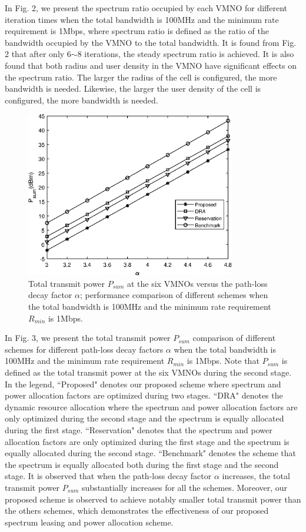 \documentclass[journal]{IEEEtran}
\begin{document}
In Fig. 2, we present the spectrum ratio occupied by each VMNO for different iteration times when the total bandwidth is 100MHz and the minimum rate requirement is 1Mbps, where spectrum ratio is defined as the ratio of the bandwidth occupied by the VMNO to the total bandwidth.  It is found from Fig. 2 that after only 6$\sim$8 iterations, the steady spectrum ratio is achieved. It is also found that both radius and user density in the VMNO have significant effects on the spectrum ratio. The larger the radius of the cell is configured, the more bandwidth is needed. Likewise, the larger the user density of the cell is configured, the more bandwidth is needed. 



\begin{figure}
	\centering
	\includegraphics[width=3.6in]{P_alpha.eps}
	\caption{Total transmit power $P_{sum}$ at the six VMNOs versus the path-loss decay factor $\alpha$; performance comparison of different schemes when the total bandwidth is 100MHz and the minimum rate requirement $R_{min}$ is 1Mbps.}
\end{figure}
In Fig. 3, we present the total transmit power $P_{sum}$ comparison of different schemes for different path-loss decay factors $\alpha$ when the total bandwidth is 100MHz and the minimum rate requirement $R_{min}$ is 1Mbps. Note that $P_{sum}$ is defined as the total transmit power at the six VMNOs during the second stage. In the legend, ``Proposed" denotes our proposed scheme where spectrum and power allocation factors are optimized during two stages. ``DRA" denotes the dynamic resource allocation where the spectrum and power allocation factors are only optimized during the second stage and the spectrum is equally allocated during the first stage. ``Reservation" denotes that the spectrum and power allocation factors are only optimized during the first stage and the spectrum is equally allocated during the second stage. ``Benchmark" denotes the scheme that the spectrum is equally allocated both during the first stage and the second stage. It is observed that when the path-loss decay factor $\alpha$ increases, the total transmit power $P_{sum}$ substantially increases for all the schemes. Moreover, our proposed scheme is observed to achieve notably smaller total transmit power than the others schemes, which demonstrates the effectiveness of our proposed spectrum leasing and power allocation scheme.
\end{document}
